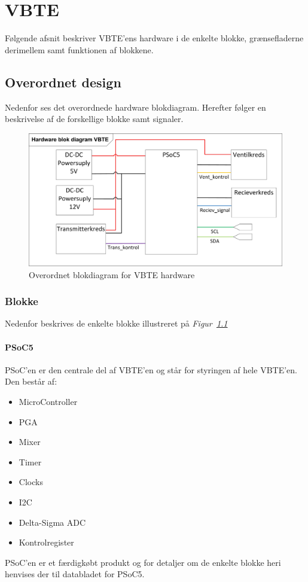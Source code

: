 \chapter{VBTE}
Følgende afsnit beskriver VBTE'ens hardware i de enkelte blokke, grænsefladerne derimellem samt funktionen af blokkene.

\section{Overordnet design}
Nedenfor ses det overordnede hardware blokdiagram. Herefter følger en beskrivelse af de forskellige blokke samt signaler.
\begin{figure}[H]
\centering
\includegraphics[width=.85\textwidth]{billeder/HWVBTE}
\caption{Overordnet blokdiagram for VBTE hardware}
\label{fig:HWVBTE}
\end{figure}
\subsection{Blokke}
Nedenfor beskrives de enkelte blokke illustreret på \textit{Figur~\ref{fig:HWVBTE}}
\subsubsection{PSoC5}
PSoC'en er den centrale del af VBTE'en og står for styringen af hele VBTE'en. Den består af:
\begin{itemize}
\item MicroController
\item PGA
\item Mixer
\item Timer
\item Clocks
\item I2C
\item Delta-Sigma ADC
\item Kontrolregister
\end{itemize}
PSoC'en er et færdigkøbt produkt og for detaljer om de enkelte blokke heri henvises der til databladet for PSoC5.
